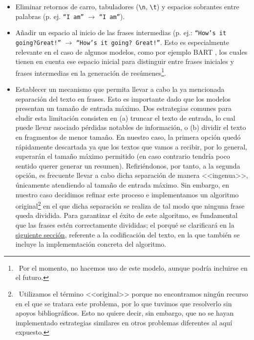 \begin{itemize}
	\item [\textbullet] Eliminar retornos de carro, tabuladores (\texttt{\textbackslash n}, \texttt{\textbackslash t}) y espacios sobrantes entre palabras (p. ej. \texttt{``I \quad am''} $\rightarrow$ \texttt{``I am''}).
	
	\item [\textbullet] Añadir un espacio al inicio de las frases intermedias (p. ej.: \texttt{``How's it going?Great!''} $\rightarrow$ \texttt{``How's it going? Great!''}. Esto es especialmente relevante en el caso de algunos modelos, como por ejemplo BART \cite{lewis19}, los cuales tienen en cuenta ese espacio inicial para distinguir entre frases iniciales y frases intermedias en la generación de resúmenes\footnote{\, Por el momento, no hacemos uso de este modelo, aunque podría incluirse en el futuro.}.
	
	\item [\textbullet] Establecer un mecanismo que permita llevar a cabo la ya mencionada separación del texto en frases. Esto es importante dado que los modelos presentan un tamaño de entrada máximo. Dos estrategias comunes para eludir esta limitación consisten en (a) truncar el texto de entrada, lo cual puede llevar asociado pérdidas notables de información, o (b) dividir el texto en fragmentos de menor tamaño. En nuestro caso, la primera opción quedó rápidamente descartada ya que los textos que vamos a recibir, por lo general, superarán el tamaño máximo permitido (en caso contrario tendría poco sentido querer generar un resumen). Refiriéndonos, por tanto, a la segunda opción, es frecuente llevar a cabo dicha separación de manera <<ingenua>>, únicamente atendiendo al tamaño de entrada máximo. Sin embargo, en nuestro caso decidimos refinar este proceso e implementamos un algoritmo original\footnote{\, Utilizamos el término <<original>> porque no encontramos ningún recurso en el que se tratara este problema, por lo que tuvimos que resolverlo sin apoyos bibliográficos. Esto no quiere decir, sin embargo, que no se hayan implementado estrategias similares en otros problemas diferentes al aquí expuesto.} en el que dicha separación se realiza de tal modo que ninguna frase queda dividida. Para garantizar el éxito de este algoritmo, es fundamental que las frases estén correctamente divididas; el porqué se clarificará en la \hyperref[sec:codificacion]{siguiente sección}, referente a la codificación del texto, en la que también se incluye la implememtación concreta del algoritmo.
\end{itemize}

